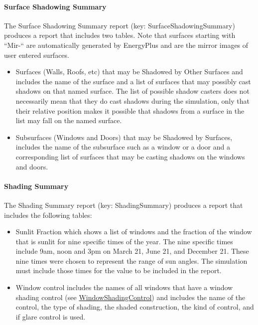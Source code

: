 \paragraph{Surface Shadowing Summary}\label{surface-shadowing-summary}

The Surface Shadowing Summary report (key: SurfaceShadowingSummary) produces a report that includes two tables. Note that surfaces starting with ``Mir-`` are automatically generated by EnergyPlus and are the mirror images of user entered surfaces.

\begin{itemize}
\item
  Surfaces (Walls, Roofs, etc) that may be Shadowed by Other Surfaces and includes the name of the surface and a list of surfaces that may possibly cast shadows on that named surface. The list of possible shadow casters does not necessarily mean that they do cast shadows during the simulation, only that their relative position makes it possible that shadows from a surface in the list may fall on the named surface.
\item
  Subsurfaces (Windows and Doors) that may be Shadowed by Surfaces, includes the name of the subsurface such as a window or a door and a corresponding list of surfaces that may be casting shadows on the windows and doors.
\end{itemize}

\paragraph{Shading Summary}\label{shading-summary}

The Shading Summary report (key: ShadingSummary) produces a report that includes the following tables:

\begin{itemize}
\item
  Sunlit Fraction which shows a list of windows and the fraction of the window that is sunlit for nine specific times of the year. The nine specific times include 9am, noon and 3pm on March 21, June 21, and December 21. These nine times were chosen to represent the range of sun angles. The simulation must include those times for the value to be included in the report.
\item
  Window control includes the names of all windows that have a window shading control (see \hyperref[windowpropertyshadingcontrol]{WindowShadingControl}) and includes the name of the control, the type of shading, the shaded construction, the kind of control, and if glare control is used.
\end{itemize}

